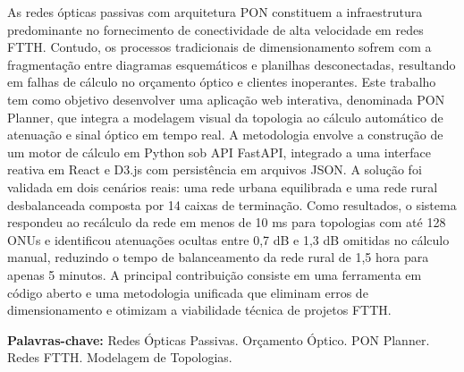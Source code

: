 \begin{resumo}
\noindent As redes ópticas passivas com arquitetura PON constituem a infraestrutura predominante no fornecimento de conectividade de alta velocidade em redes FTTH. Contudo, os processos tradicionais de dimensionamento sofrem com a fragmentação entre diagramas esquemáticos e planilhas desconectadas, resultando em falhas de cálculo no orçamento óptico e clientes inoperantes. Este trabalho tem como objetivo desenvolver uma aplicação web interativa, denominada PON Planner, que integra a modelagem visual da topologia ao cálculo automático de atenuação e sinal óptico em tempo real. A metodologia envolve a construção de um motor de cálculo em Python sob API FastAPI, integrado a uma interface reativa em React e D3.js com persistência em arquivos JSON. A solução foi validada em dois cenários reais: uma rede urbana equilibrada e uma rede rural desbalanceada composta por 14 caixas de terminação. Como resultados, o sistema respondeu ao recálculo da rede em menos de 10 ms para topologias com até 128 ONUs e identificou atenuações ocultas entre 0,7 dB e 1,3 dB omitidas no cálculo manual, reduzindo o tempo de balanceamento da rede rural de 1,5 hora para apenas 5 minutos. A principal contribuição consiste em uma ferramenta em código aberto e uma metodologia unificada que eliminam erros de dimensionamento e otimizam a viabilidade técnica de projetos FTTH.

\vspace{0.5cm}   
\noindent \textbf{Palavras-chave:} Redes Ópticas Passivas. Orçamento Óptico. PON Planner. Redes FTTH. Modelagem de Topologias.
\end{resumo}
 
